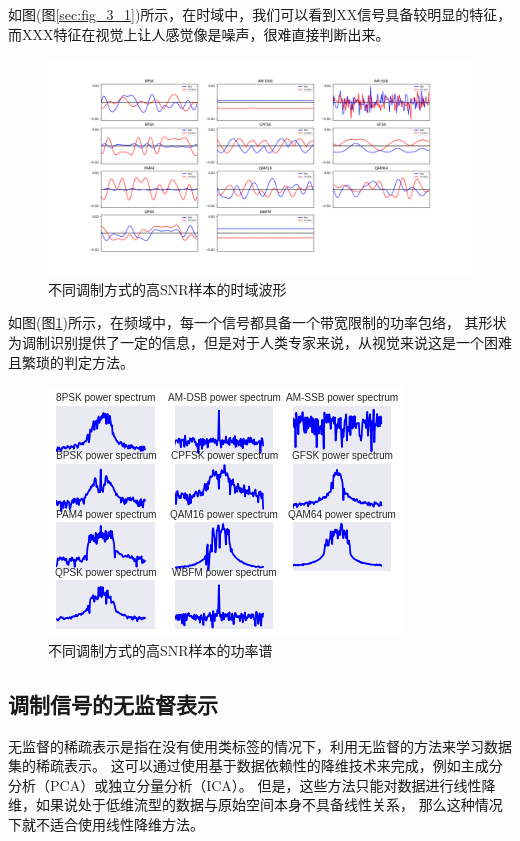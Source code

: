如图(图\ref{sec:fig_3_1})所示，在时域中，我们可以看到XX信号具备较明显的特征，
而XXX特征在视觉上让人感觉像是噪声，很难直接判断出来。\par
\begin{figure}[!h]
	\centering
	\includegraphics[scale=0.2]{figures/chapter_3/signal_view_1}
	\caption{不同调制方式的高SNR样本的时域波形}\label{sec:fig_3_2}
\end{figure}

如图(图\ref{sec:fig_3_2})所示，在频域中，每一个信号都具备一个带宽限制的功率包络，
其形状为调制识别提供了一定的信息，但是对于人类专家来说，从视觉来说这是一个困难且繁琐的判定方法。\par
\begin{figure}[!h]
	\centering
	\includegraphics[scale=0.9]{figures/chapter_3/signal_view_2}
	\caption{不同调制方式的高SNR样本的功率谱}\label{sec:fig_3_3}
\end{figure}

\subsection{调制信号的无监督表示}

无监督的稀疏表示是指在没有使用类标签的情况下，利用无监督的方法来学习数据集的稀疏表示。
这可以通过使用基于数据依赖性的降维技术来完成，例如主成分分析（PCA）或独立分量分析（ICA）。
但是，这些方法只能对数据进行线性降维，如果说处于低维流型的数据与原始空间本身不具备线性关系，
那么这种情况下就不适合使用线性降维方法。\par

